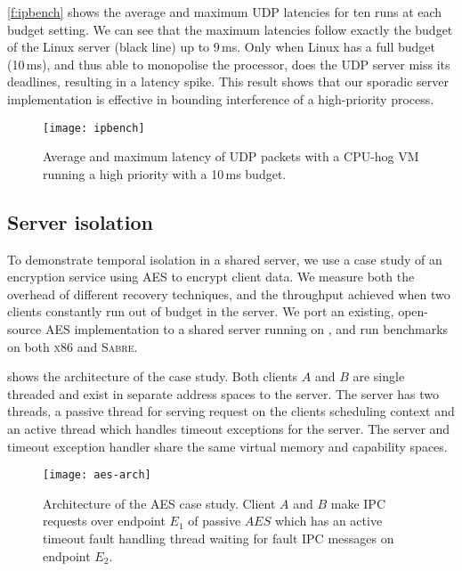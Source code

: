\autoref{f:ipbench} shows the average and maximum \gls{UDP} latencies for
ten runs at each budget setting. We can see that the maximum latencies
follow exactly the budget of the Linux server (black line) up to 9\,ms. Only
when Linux has a full budget (10\,ms), and thus able to monopolise the
processor, does the UDP server miss its deadlines, resulting in a
latency spike.  This result shows that our sporadic server implementation is effective in bounding
interference of a high-priority process.

\begin{figure}[h]
  \centering
  \texttt{[image: ipbench]}
  \caption[Results of ipbench isolation benchmark.]{Average and maximum latency of UDP packets with
  a CPU-hog VM running a high priority with a 10\,ms budget.}
  \label{f:ipbench}
\end{figure}

\subsection{Server isolation} 
\label{s:server-isolation}

To demonstrate temporal isolation in a shared server, we use a case study of an encryption service
using \gls{AES} to encrypt client data. We measure both the overhead of different
recovery techniques, and the throughput achieved when two clients constantly run out of budget in the server. 
We port an existing, open-source \gls{AES} implementation to a shared server running on \selfour, and run
benchmarks on both \textsc{x86} and \textsc{Sabre}.

 shows the architecture of the case study. Both clients $A$ and $B$ are single
 threaded and exist in separate address spaces to the server. The server has two threads, a passive
 thread for serving request on the clients scheduling context and an active thread which handles
 timeout exceptions for the server. The server and timeout exception handler share the same virtual
 memory and capability spaces.

\begin{figure}
\centering
\texttt{[image: aes-arch]}
\caption[Architecture of the AES case study.]{Architecture of the \gls{AES} case study. Client $A$ and $B$ make \gls{IPC} requests over
endpoint $E_{1}$ of passive $AES$ which has an active timeout fault handling thread waiting for
fault \gls{IPC} messages on endpoint $E_{2}$.}
\label{f:aes-arch}
\end{figure}

